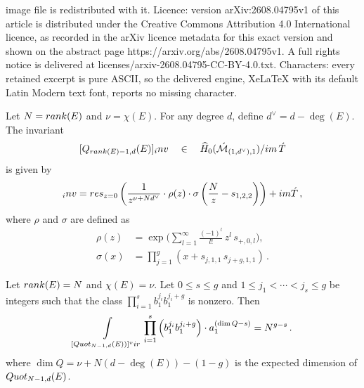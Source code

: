 \documentclass[10pt,a4paper]{amsart}
\newcommand{\Mdash}{\acute{\mathcal{M}}}
\newcommand{\du}{d^\vee}
\newcommand{\im}{\textnormal{im}\,}
\newcommand{\inv}[0]{\textnormal{inv}}
\newcommand{\quot}[0]{\textnormal{Quot}}
\newcommand{\res}{\textnormal{res}}
\newcommand{\rk}{\textnormal{rank}}
\newcommand{\vir}[0]{\textnormal{vir}}
\newcommand{\wh}[1]{\widehat{#1}}
\begin{document}
image file is redistributed with it. Licence: version arXiv:2608.04795v1 of this article is distributed under the Creative Commons Attribution 4.0 International licence, as recorded in the arXiv licence metadata for this exact version and shown on the abstract page https://arxiv.org/abs/2608.04795v1. A full rights notice is delivered at licenses/arxiv-2608.04795-CC-BY-4.0.txt. Characters: every retained excerpt is pure ASCII, so the delivered engine, XeLaTeX with its default Latin Modern text font, reports no missing character.
\begin{theorem}\label{theorem invariant quot N-1}
    Let $N =\rk(E)$ and $\nu = \chi(E)$.
    For any degree $d$, define $\du = d- \deg(E)$.
    The invariant 
    $$[Q_{\rk(E)-1,d}(E)]_\inv \quad  \in \quad \wh H_0(\Mdash_{(1,\du),1})/\im \acute T$$ is given by
    \begin{equation*}%
    [Q_{\rk(E)-1,d}(E)]_\inv = 
    \res_{z=0} \left( \frac{1}{z^{\nu+N\du}} \cdot \rho(z) \cdot \sigma\left(\frac{N}{z} -s_{1,2,2}\right)\right) + \textnormal{im} \acute{T}\,,
    \end{equation*}
    where $\rho$ and $\sigma$ are defined as
\begin{align}\label{equation definition rho}
    \rho (z) & = \exp \biggl(
        \sum_{l=1}^\infty \frac{(-1)^l}{l!} \, z^l \, s_{{+},0,l}
    \biggr), \\
    \nonumber
    \sigma (x) & =
    \prod_{j=1}^g {} (x + s_{j,1,1} \, s_{j+g,1,1})\,.
\end{align}
\end{theorem}

\begin{theorem}\label{theorem intersections on Quot N-1}
    Let $\rk(E)=N$ and $\chi(E) = \nu$.
    Let $0 \leqslant s \leqslant g$ and $1 \leqslant j_1 < \cdots < j_s \leqslant g$ be integers
    such that the class $\prod_{i=1}^s b_1^{j_i}b_1^{j_i+g}$
    is nonzero.
    Then
    \begin{equation*}
        \int\limits_{[\quot_{N-1,d}(E))]^\vir} 
        \prod_{i=1}^s \left(b_1^{j_i}b_1^{j_i+g}\right) \cdot 
        a_1^{(\dim Q-s)} = N^{g-s}\,.
    \end{equation*}
    where $\dim Q = \nu + N(d - \deg(E)) - (1-g)$ is the expected dimension of $\quot_{N-1,d}(E)$.
\end{theorem}
\end{document}
